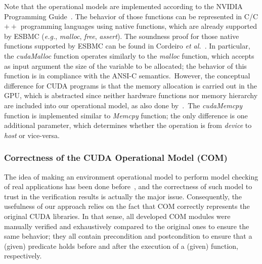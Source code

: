 \documentclass[times, doublespace]{cpeauth}
\begin{document}
Note that the operational models are implemented according to the NVIDIA Programming Guide~\cite{cudaproguide:2015}. The behavior of those functions can be represented in C/C$++$ programming languages using native functions, which are already supported by ESBMC ({\it e.g.}, \textit{malloc}, \textit{free}, \textit{assert}). The soundness proof for those native functions supported by ESBMC can be found in Cordeiro {\it et al.}~\cite{cordeiro:2012}. In particular, the \textit{cudaMalloc} function operates similarly to the \textit{malloc} function, which accepts as input argument the size of the variable to be allocated; the behavior of this function is in compliance with the ANSI-C semantics.\ However, the conceptual difference for CUDA programs is that the memory allocation is carried out in the GPU, which is abstracted since neither hardware functions nor memory hierarchy are included into our operational model, as also done by~\cite{betts:2012,Li:2010,Li:2012}.\ The \textit{cudaMemcpy} function is implemented similar to \textit{Memcpy} function; the only difference is one additional parameter, which determines whether the operation is from \textit{device} to \textit{host} or vice-versa. 


\subsubsection{Correctness of the CUDA Operational Model (COM)}
\label{sec:CorrectnessCUDAmodeloOperacional}

The idea of making an environment operational model to perform model checking of real applications has been done before~\cite{monteiro:2015,garcia:2016,android:2012,android:2015}, and the correctness of such model to trust in the verification results is actually the major issue. Consequently, the usefulness of our approach relies on the fact that COM correctly represents the original CUDA libraries. In that sense, all developed COM modules were manually verified and exhaustively compared to the original ones to ensure the same behavior; they all contain precondition and postcondition to ensure that a (given) predicate holds before and after the execution of a (given) function, respectively.
\end{document}
